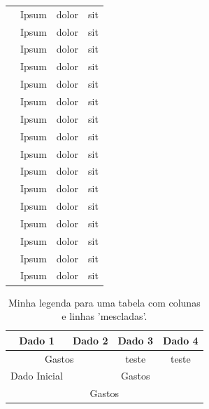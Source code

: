\documentclass{article}
\begin{document}
\begin{longtable}{p{6.5cm}p{3.5cm}p{0.3cm}p{0.5cm}}
            \citet{Lorem}                 & Ipsum                  & dolor & sit \\
            \citet{Lorem}                 & Ipsum                  & dolor & sit \\
            \citet{Lorem}                 & Ipsum                  & dolor & sit \\
            \citet{Lorem}                 & Ipsum                  & dolor & sit \\
            \citet{Lorem}                 & Ipsum                  & dolor & sit \\
            \citet{Lorem}                 & Ipsum                  & dolor & sit \\
            \citet{Lorem}                 & Ipsum                  & dolor & sit \\
            \citet{Lorem}                 & Ipsum                  & dolor & sit \\
            \citet{Lorem}                 & Ipsum                  & dolor & sit \\
            \citet{Lorem}                 & Ipsum                  & dolor & sit \\
            \citet{Lorem}                 & Ipsum                  & dolor & sit \\
            \citet{Lorem}                 & Ipsum                  & dolor & sit \\
            \citet{Lorem}                 & Ipsum                  & dolor & sit \\
            \citet{Lorem}                 & Ipsum                  & dolor & sit \\
            \citet{Lorem}                 & Ipsum                  & dolor & sit \\
            \citet{Lorem}                 & Ipsum                  & dolor & sit 
\end{longtable}

\begin{table}[!htpb]
    \centering
    \begin{tabular}{|c|c|c|c|}
         \hline
         \textbf{Dado 1} & \textbf{Dado 2} & \textbf{Dado 3} & \textbf{Dado 4} \\
         \hline
         
         \multicolumn{2}{|c|}{Gastos} & teste & teste\\
         \hline
         
         Dado Inicial & \multicolumn{3}{|c|}{Gastos} \\
         \hline
         
         \multicolumn{4}{|c|}{Gastos} \\
         \hline
    \end{tabular}
    \caption{Minha legenda para uma tabela com colunas e linhas 'mescladas'.}
    \label{tab:my_label}
\end{table}
\end{document}
